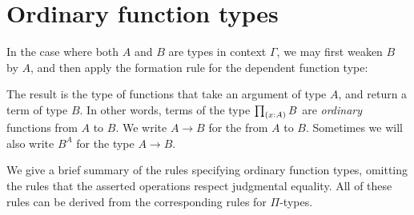 \section{Ordinary function types}
In the case where both $A$ and $B$ are types in context $\Gamma$, we may first weaken $B$ by $A$, and then apply the formation rule for the dependent function type:
\begin{prooftree}
\end{prooftree}
The result is the type of functions that take an argument of type $A$, and return a term of type $B$. In other words, terms of the type $\prd{x:A}B$ are \emph{ordinary} functions from $A$ to $B$. We write $A\to B$ for the  from $A$ to $B$. Sometimes we will also write $B^A$ for the type $A\to B$.

We give a brief summary of the rules specifying ordinary function types, omitting the rules that the asserted operations respect judgmental equality. All of these rules can be derived from the corresponding rules for $\Pi$-types.
\begin{prooftree}
\end{prooftree}%
\begin{prooftree}
\end{prooftree}%
\begin{prooftree}
\end{prooftree}%
\begin{prooftree}
\end{prooftree}%
\begin{prooftree}
\end{prooftree}

